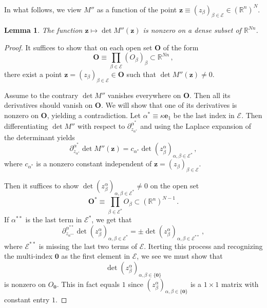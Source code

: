 \documentclass{amsart}%
\theoremstyle{plain}
\newtheorem{lemma}[theorem]{Lemma}
\numberwithin{equation}{section}
\begin{document}
In what follows, we view $M''$ as a function of the point $\mathbf{z} \equiv (z_{\beta})_{\beta \in \mathcal{E}} \in \left (\mathbb{R}^{n} \right)^N$.
\begin{lemma}\label{lemma:det_nondegen}
	The function $\mathbf{z} \mapsto \det M'' (\mathbf{z})$ is nonzero on a dense subset of $\mathbb{R}^{Nn}$.	
\end{lemma}
\begin{proof}
	It suffices to show that on each open set $\mathbf{O}$ of the form
	\[
		\mathbf{O} \equiv \prod\limits_{\beta \in \mathcal{E}} \left ( O_{\beta} \right )_{\beta} \subset \mathbb{R}^{Nn} \, ,
	\]
	there exist a point $\mathbf{z} = \left ( z_{\beta} \right )_{\beta \in \mathcal{E}} \in \mathbf{O}$ such that $\det M'' \left (\mathbf{z} \right ) \neq 0$. 

	Assume to the contrary $\det M''$ vanishes everywhere on $\mathbf{O}$. Then all its derivatives should vanish on $\mathbf{O}$. We will show that one of its derivatives is nonzero on $\mathbf{O}$, yielding a contradiction. Let $\alpha^* \equiv \kappa \mathbf{e}_1$ be the last index in $\mathcal{E}$. Then differentiating $\det M''$ with respect to $\partial^{\alpha^*} _{z_{\alpha^*}}$ and using the Laplace expansion of the determinant yields 
	\[
		\partial^{\alpha^*} _{z_{\alpha^*}} \det M'' \left ( \mathbf{z} \right )  =  c_{\alpha^*}   \det \left ( z_{\beta} ^{\alpha} \right )_{\alpha, \beta \in \mathcal{E}^*} \, , 
	\]
	where $c_{\alpha^*}$ is a nonzero constant independent of $\mathbf{z} = \left ( z_{\beta} \right )_{\beta \in \mathcal{E}}$.

	Then it suffices to show $\det \left ( z_{\beta} ^{\alpha} \right )_{\alpha, \beta \in \mathcal{E}^*} \neq 0$ on the open set 
	\[
		\mathbf{O}^* \equiv \prod\limits_{\beta \in \mathcal{E}^*} O_{\beta} \subset \left ( \mathbb{R}^n \right)^{N-1}\, .
	\]
	If $\alpha^{**}$ is the last term in $\mathcal{E}^*$, we get that
	\[
		\partial_{z_{\alpha^{**}}} ^{\alpha^{**}} \det \left ( z_{\beta} ^{\alpha} \right )_{\alpha, \beta \in \mathcal{E}^*} = \pm \det \left ( z_{\beta} ^{\alpha} \right )_{\alpha, \beta \in \mathcal{E}^{**}} \ , 
	\]
	where $\mathcal{E}^{**}$ is missing the last two terms of $\mathcal{E}$. Iterting this process and recognizing the multi-index $\mathbf{0}$ as the first element in $\mathcal{E}$, we see we must show that
	\[
		\det \left ( z_{\beta} ^{\alpha} \right )_{\alpha, \beta \in \{ \mathbf{0} \}} 
	\]
	is nonzero on $O_{\mathbf{0}}$. This in fact equals $1$ since $\left ( z_{\beta} ^{\alpha} \right )_{\alpha, \beta \in \{ \mathbf{0} \}}$ is a $1 \times 1$ matrix with constant entry $1$.	
	\end{proof}
\end{document}
